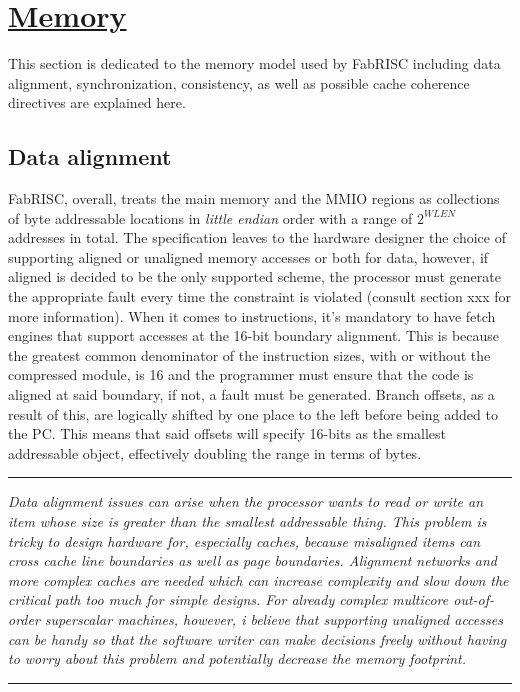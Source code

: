 \documentclass{article}
\begin{document}
    \clearpage


    \section[Memory]{\LARGE\underline{Memory}}

        This section is dedicated to the memory model used by FabRISC including data alignment, synchronization, consistency, as well as possible cache coherence directives are explained here.

        \subsection[Data alignment]{Data alignment}

            FabRISC, overall, treats the main memory and the MMIO regions as collections of byte addressable locations in \textit{little endian} order with a range of $2^{WLEN}$ addresses in total. The specification leaves to the hardware designer the choice of supporting aligned or unaligned memory accesses or both for data, however, if aligned is decided to be the only supported scheme, the processor must generate the appropriate fault every time the constraint is violated (consult section xxx for more information). When it comes to instructions, it's mandatory to have fetch engines that support accesses at the 16-bit boundary alignment. This is because the greatest common denominator of the instruction sizes, with or without the compressed module, is 16 and the programmer must ensure that the code is aligned at said boundary, if not, a fault must be generated. Branch offsets, as a result of this, are logically shifted by one place to the left before being added to the PC. This means that said offsets will specify 16-bits as the smallest addressable object, effectively doubling the range in terms of bytes.

        \par\noindent\rule{\textwidth}{0.4pt}
        \textit{Data alignment issues can arise when the processor wants to read or write an item whose size is greater than the smallest addressable thing. This problem is tricky to design hardware for, especially caches, because misaligned items can cross cache line boundaries as well as page boundaries. Alignment networks and more complex caches are needed which can increase complexity and slow down the critical path too much for simple designs. For already complex multicore out-of-order superscalar machines, however, i believe that supporting unaligned accesses can be handy so that the software writer can make decisions freely without having to worry about this problem and potentially decrease the memory footprint.}
        \par\noindent\rule{\textwidth}{0.4pt}
\end{document}
